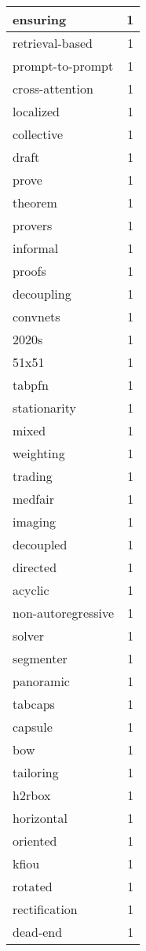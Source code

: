 \begin{table}[h]
\begin{tabular}{|l|r|}
\hline
ensuring & 1 \\
\hline
retrieval-based & 1 \\
\hline
prompt-to-prompt & 1 \\
\hline
cross-attention & 1 \\
\hline
localized & 1 \\
\hline
collective & 1 \\
\hline
draft & 1 \\
\hline
prove & 1 \\
\hline
theorem & 1 \\
\hline
provers & 1 \\
\hline
informal & 1 \\
\hline
proofs & 1 \\
\hline
decoupling & 1 \\
\hline
convnets & 1 \\
\hline
2020s & 1 \\
\hline
51x51 & 1 \\
\hline
tabpfn & 1 \\
\hline
stationarity & 1 \\
\hline
mixed & 1 \\
\hline
weighting & 1 \\
\hline
trading & 1 \\
\hline
medfair & 1 \\
\hline
imaging & 1 \\
\hline
decoupled & 1 \\
\hline
directed & 1 \\
\hline
acyclic & 1 \\
\hline
non-autoregressive & 1 \\
\hline
solver & 1 \\
\hline
segmenter & 1 \\
\hline
panoramic & 1 \\
\hline
tabcaps & 1 \\
\hline
capsule & 1 \\
\hline
bow & 1 \\
\hline
tailoring & 1 \\
\hline
h2rbox & 1 \\
\hline
horizontal & 1 \\
\hline
oriented & 1 \\
\hline
kfiou & 1 \\
\hline
rotated & 1 \\
\hline
rectification & 1 \\
\hline
dead-end & 1 \\
\hline

\end{tabular}
\end{table}
